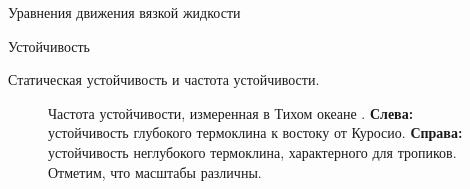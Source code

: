 \begin{chapter}{Уравнения движения вязкой жидкости}
\begin{section}{Устойчивость}
\begin{paragraph}{Статическая устойчивость и частота устойчивости.}
\begin{figure}[t!]
\caption{Частота устойчивости, измеренная в Тихом океане%
. 
\textbf{Слева:} устойчивость глубокого термоклина
к востоку от Куросио.
\textbf{Справа:} устойчивость неглубокого термоклина, характерного для 
тропиков. Отметим, что масштабы различны.}  
\label{fig:stabilityfreq}
\end{figure}
%


\end{paragraph}
\end{section}
\end{chapter}
